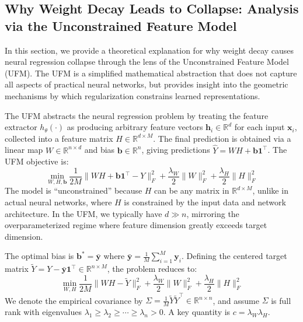\subsection{Why Weight Decay Leads to Collapse: Analysis via the Unconstrained Feature Model}
\label{appx:ufm_collapse}

In this section, we provide a theoretical explanation for why weight decay causes neural regression collapse through the lens of the Unconstrained Feature Model (UFM). The UFM is a simplified mathematical abstraction that does not capture all aspects of practical neural networks, but provides insight into the geometric mechanisms by which regularization constrains learned representations.

The UFM abstracts the neural regression problem by treating the feature extractor $h_\theta(\cdot)$ as producing arbitrary feature vectors $\mathbf{h}_i \in \mathbb{R}^d$ for each input $\mathbf{x}_i$, collected into a feature matrix $H \in \mathbb{R}^{d \times M}$. The final prediction is obtained via a linear map $W \in \mathbb{R}^{n \times d}$ and bias $\mathbf{b} \in \mathbb{R}^n$, giving predictions $\hat{Y} = WH + \mathbf{b} \mathbf{1}^\top$. The UFM objective is:
\begin{equation}
\min_{W, H, \mathbf{b}} \frac{1}{2M} \|WH + \mathbf{b}\mathbf{1}^\top - Y\|_F^2 + \frac{\lambda_W}{2}\|W\|_F^2 + \frac{\lambda_H}{2}\|H\|_F^2
\end{equation}
The model is ``unconstrained'' because $H$ can be any matrix in $\mathbb{R}^{d \times M}$, unlike in actual neural networks, where $H$ is constrained by the input data and network architecture. In the UFM, we typically have $d \gg n$, mirroring the overparameterized regime where feature dimension greatly exceeds target dimension.

The optimal bias is $\mathbf{b}^* = \bar{\mathbf{y}}$ where $\bar{\mathbf{y}} = \frac{1}{M}\sum_{i=1}^M \mathbf{y}_i$. Defining the centered target matrix $\tilde{Y} = Y - \bar{\mathbf{y}}\mathbf{1}^\top \in \mathbb{R}^{n \times M}$, the problem reduces to:
\begin{equation}
\min_{W, H} \frac{1}{2M} \|WH - \tilde{Y}\|_F^2 + \frac{\lambda_W}{2}\|W\|_F^2 + \frac{\lambda_H}{2}\|H\|_F^2
\label{eq:ufm_centered}
\end{equation}
We denote the empirical covariance by $\Sigma = \frac{1}{M}\tilde{Y}\tilde{Y}^\top \in \mathbb{R}^{n \times n}$, and assume $\Sigma$ is full rank with eigenvalues $\lambda_1 \geq \lambda_2 \geq \cdots \geq \lambda_n > 0$. A key quantity is $c = \lambda_W \lambda_H$.

